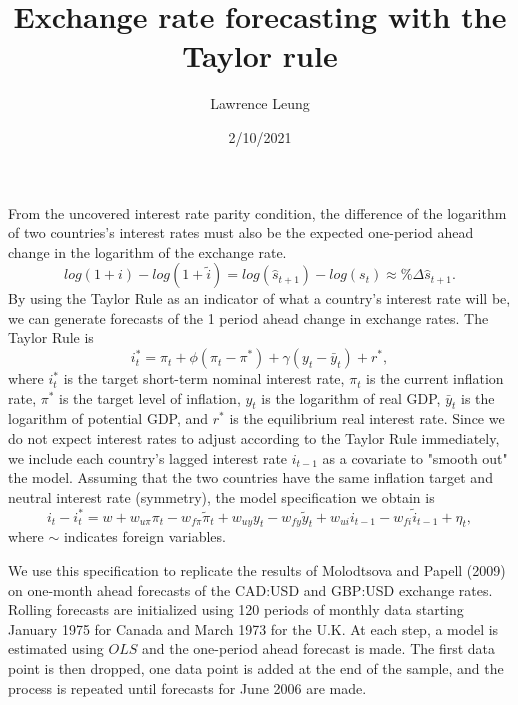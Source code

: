 \documentclass{article}
\title{Exchange rate forecasting with the Taylor rule}
\author{Lawrence Leung}
\date{2/10/2021}
\begin{document}
\maketitle

From the uncovered interest rate parity condition, the difference of the logarithm of two countries's interest rates must also be the expected one-period ahead change in the logarithm of the exchange rate. 
\begin{equation}
log(1+i)-log(1+\tilde{i}) = log(\hat{s}_{t+1}) - log(s_t) \approx \%\Delta \hat{s}_{t+1}.
\end{equation}
By using the Taylor Rule as an indicator of what a country's interest rate will be, we can generate forecasts of the 1 period ahead change in exchange rates. The Taylor Rule is
\begin{equation}
i_t^* = \pi_t + \phi(\pi_t-\pi^*) + \gamma(y_t-\bar{y}_t) + r^*,
\end{equation}
where $i_t^*$ is the target short-term nominal interest rate, $\pi_t$ is the current inflation rate, $\pi^*$ is the target level of inflation, $y_t$ is the logarithm of real GDP, $\bar{y}_t$ is the logarithm of potential GDP, and $r^*$ is the equilibrium real interest rate. Since we do not expect interest rates to adjust according to the Taylor Rule immediately, we include each country's lagged interest rate $i_{t-1}$ as a covariate to "smooth out" the model. Assuming that the two countries have the same inflation target and neutral interest rate (symmetry), the model specification we obtain is
\begin{equation}
i_t-i_t^*=w+w_{u\pi}\pi_t-w_{f\pi}\tilde{\pi}_t+w_{uy}y_t-w_{fy}\tilde{y}_t+w_{ui}i_{t-1}-w_{fi}\tilde{i}_{t-1}+\eta_t,
\end{equation}
where $\sim$ indicates foreign variables. 


We use this specification to replicate the results of Molodtsova and Papell (2009) on one-month ahead forecasts of the CAD:USD and GBP:USD exchange rates. Rolling forecasts are initialized using 120 periods of monthly data starting January 1975 for Canada and March 1973 for the U.K. At each step, a model is estimated using $OLS$ and the one-period ahead forecast is made. The first data point is then dropped, one data point is added at the end of the sample, and the process is repeated until forecasts for June 2006 are made.
\end{document}
